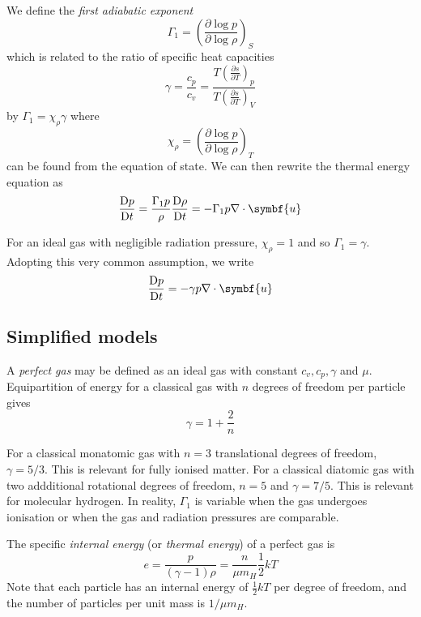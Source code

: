 \documentclass{jknotes}
\begin{document}
We define the \emph{first adiabatic exponent}
\begin{equation}
	\Gamma_1 = \left( \frac{\partial \log p}{\partial \log \rho}\right)_S
\end{equation}
which is related to the ratio of specific heat capacities
\begin{equation}
	\gamma = \frac{c_p}{c_v} = \frac{T \left(\frac{\partial s}{\partial
	T}\right)_p}{T \left( \frac{\partial s}{\partial T}\right)_V}
\end{equation}
by $\Gamma_1 = \chi_\rho \gamma$ where
\begin{equation}
	\chi_\rho = \left( \frac{\partial \log p}{\partial \log \rho}\right)_T
\end{equation}
can be found from the equation of state. We can then rewrite the thermal
energy equation as
\begin{equation}
	\frac{\diffD p}{\diffD t} = \frac{\Gamma_1 p}{\rho} \frac{\diffD
	\rho}{\diffD t} = - \Gamma_1 p \nabla \cdot \symbf{u}
\end{equation}

For an ideal gas with negligible radiation pressure, $\chi_\rho =1$ and so
$\Gamma_1 = \gamma$. Adopting this very common assumption, we write
\begin{equation}
	\frac{\diffD p}{\diffD t} = -\gamma p \nabla \cdot \symbf{u}
\end{equation}

\subsection{Simplified models}
A \emph{perfect gas} may be defined as an ideal gas with constant $c_v, c_p,
\gamma$ and $\mu$. Equipartition of energy for a classical gas with $n$
degrees of freedom per particle gives
\begin{equation}
	\gamma = 1 + \frac{2}{n}
\end{equation}

For a classical monatomic gas with $n=3$ translational degrees of freedom,
$\gamma = 5/3$. This is relevant for fully ionised matter. For a classical
diatomic gas with two addditional rotational degrees of freedom, $n=5$ and
$\gamma = 7/5$. This is relevant for molecular hydrogen. In reality,
$\Gamma_1$ is variable when the gas undergoes ionisation or when the gas and
radiation pressures are comparable. 

The specific \emph{internal energy} (or \emph{thermal energy}) of a perfect
gas is
\begin{equation}
	e = \frac{p}{(\gamma-1)\rho} = \frac{n}{\mu m_H} \frac{1}{2}kT
\end{equation}
Note that each particle has an internal energy of $\frac{1}{2}kT$ per degree
of freedom, and the number of particles per unit mass is $1/{\mu m_H}$.
\end{document}
